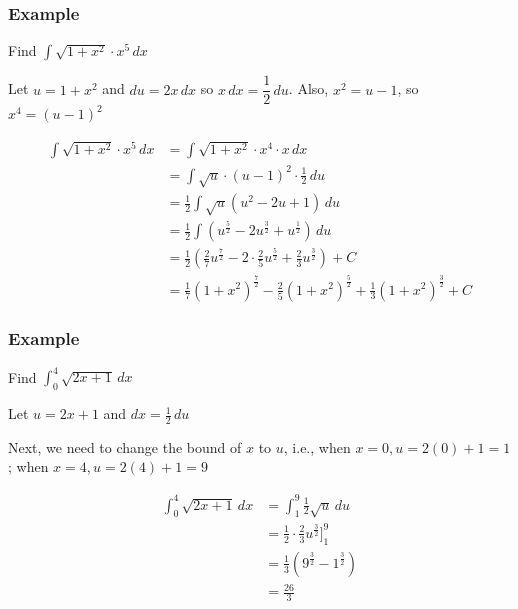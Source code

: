 \documentclass[t]{beamer}
\theoremstyle{plain}
\theoremstyle{definition}
\newcommand{\ds}{\displaystyle}
\begin{document}
\begin{frame}

\frametitle{Example}

\footnotesize

Find $\ds \int \sqrt{1 + x^2} \cdot x^5 \,dx $ \pause

\medskip

Let $u = 1 + x^2$ and $du = 2x \, dx$ so $x \, dx = \dfrac{1}{2} \,du$.  Also, $x^2 = u - 1$, so $x^4 = (u-1)^2$

\begin{align*}
\ds \int \sqrt{1 + x^2} \cdot x^5 \,dx &= \ds \int \sqrt{1 + x^2} \cdot x^4 \cdot x \,dx\\
&= \int \sqrt{u} \cdot (u-1)^2 \cdot \frac{1}{2} \,du\\
& = \frac{1}{2} \int \sqrt{u} (u^2 - 2u + 1) \, du \\
& = \frac{1}{2} \int (u^{\frac{5}{2}} - 2u^{\frac{3}{2}} + u^{\frac{1}{2}}) \, du\\
& = \frac{1}{2} (\frac{2}{7}u^{\frac{7}{2}} - 2 \cdot \frac{2}{5}u^{\frac{5}{2}} + \frac{2}{3}u^{\frac{3}{2}}) + C\\
& = \frac{1}{7}(1+x^2)^{\frac{7}{2}} - \frac{2}{5}(1+x^2)^{\frac{5}{2}} + \frac{1}{3}(1+x^2)^{\frac{3}{2}} + C
\end{align*}

\end{frame}

\begin{frame}

\frametitle{Example}

Find $\ds \int_{0}^{4} \sqrt{2x + 1} \, dx$ \pause

\medskip

Let $u =2x + 1$ and $dx =\frac{1}{2}\, du$ 

\medskip

Next, we need to change the bound of $x$ to $u$, i.e., when $x = 0, u = 2(0) + 1 = 1$; when $x = 4, u = 2(4) + 1 = 9$

\begin{align*}
\ds \int_{0}^{4} \sqrt{2x + 1} \, dx &= \int_{1}^{9} \frac{1}{2}\sqrt{u} \,du\\
&= \frac{1}{2} \cdot \frac{2}{3}u^{\frac{3}{2}} \ds\big]_{1}^{9}\\
&= \frac{1}{3} (9^{\frac{3}{2}} - 1^{\frac{3}{2}})\\
&= \frac{26}{3}
\end{align*}

\end{frame}
\end{document}
